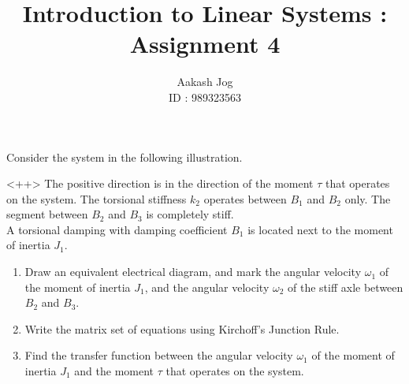 \documentclass[fleqn, a4paper, 11pt, oneside]{amsart}
\title{Introduction to Linear Systems : Assignment 4}
\author
{
	Aakash Jog\\
	ID : 989323563
}
\date{\formatdate{12}{11}{2015}}
\theoremstyle{definition}
\theoremstyle{theorem}
\begin{document}

\maketitle

\begin{question}
	Consider the system in the following illustration.
	\begin{figure}[H]
		\centering
	\end{figure}<++>
	The positive direction is in the direction of the moment $\tau$ that operates on the system.
	The torsional stiffness $k_2$ operates between $B_1$ and $B_2$ only.
	The segment between $B_2$ and $B_3$ is completely stiff.\\
	A torsional damping with damping coefficient $B_1$ is located next to the moment of inertia $J_1$.
	\begin{enumerate}
		\item Draw an equivalent electrical diagram, and mark the angular velocity $\omega_1$ of the moment of inertia $J_1$, and the angular velocity $\omega_2$ of the stiff axle between $B_2$ and $B_3$.
		\item Write the matrix set of equations using Kirchoff's Junction Rule.
		\item Find the transfer function between the angular velocity $\omega_1$ of the moment of inertia $J_1$ and the moment $\tau$ that operates on the system.
	\end{enumerate}
\end{question}
\end{document}
